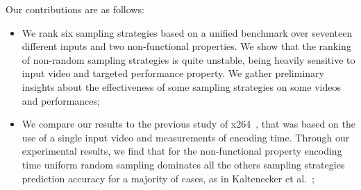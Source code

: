 Our contributions are as follows:
\vspace*{-2mm}
\begin{itemize}
    
    \item We rank six sampling strategies based on a unified benchmark over seventeen different inputs and two non-functional properties.
    We show that the ranking of non-random sampling strategies is quite unstable, being heavily sensitive to input video and targeted performance property. We gather preliminary insights about the effectiveness of some sampling strategies on some videos and performances;
    
    \item We compare our results to the previous study of x264~\cite{kaltenecker2019}, that was based on the use of a single input video and measurements of encoding time. Through our experimental results, we find that for the non-functional property encoding time
    uniform random sampling dominates all the others sampling strategies \wrt prediction accuracy for a majority of cases, 
    as in Kaltenecker et al.~\cite{kaltenecker2019};
    

\end{itemize}
